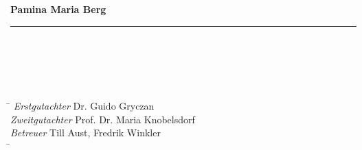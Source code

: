 \begin{titlepage}
\begin{tabular}{c}
\end{tabular}

\vspace*{10ex}

	\noindent \textbf{Pamina Maria Berg}\\
	\noindent \rule{\textwidth}{0.4mm} 
	 \\	
	 \\
	 \\
	 \\
\begin{tabbing}
\hspace{10em} \=  \kill
\emph{Erstgutachter} \> Dr. Guido Gryczan \\
\emph{Zweitgutachter} \> Prof. Dr. Maria Knobelsdorf \\
\emph{Betreuer} \> Till Aust, Fredrik Winkler \\
 \hspace{10em} \=  \kill
\end{tabbing}

\end{titlepage}

